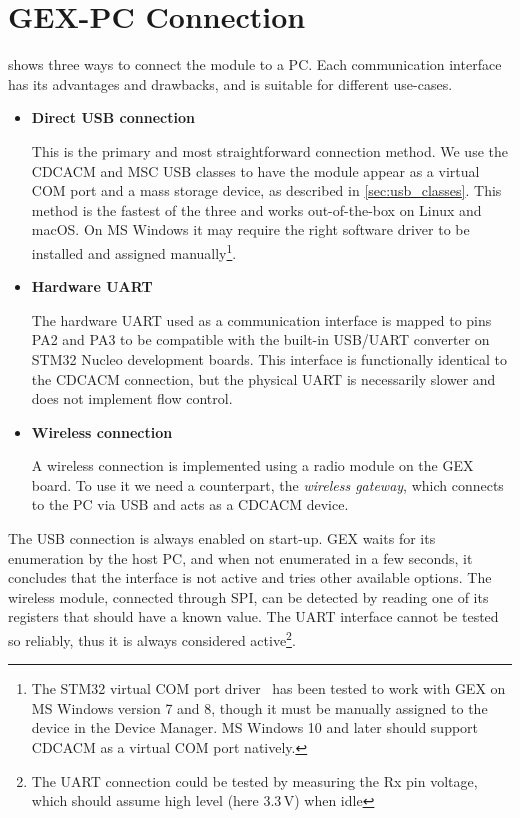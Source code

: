 \section{GEX-PC Connection}

 shows three ways to connect the module to a \gls{PC}. Each communication interface has its advantages and drawbacks, and is suitable for different use-cases.

\begin{itemize}
	\item \textbf{Direct \gls{USB} connection}
		
		This is the primary and most straightforward connection method. We use the \gls{CDCACM} and \gls{MSC} \gls{USB} classes to have the module appear as a virtual COM port and a mass storage device, as described in \cref{sec:usb_classes}. This method is the fastest of the three and works out-of-the-box on Linux and macOS. On MS Windows it may require the right software driver to be installed and assigned manually\footnote{The STM32 virtual COM port driver~\cite{stm-vcom} has been tested to work with GEX on MS Windows version 7 and 8, though it must be manually assigned to the device in the Device Manager. MS Windows 10 and later should support \gls{CDCACM} as a virtual COM port natively.}.
	
	\item \textbf{Hardware \gls{UART}}
	
		The hardware UART used as a communication interface is mapped to pins PA2 and PA3 to be compatible with the built-in \gls{USB}/\gls{UART} converter on STM32 Nucleo development boards. This interface is functionally identical to the \gls{CDCACM} connection, but the physical \gls{UART} is necessarily slower and does not implement flow control.
		
	\item \textbf{Wireless connection}
	
		A wireless connection is implemented using a radio module on the GEX board. To use it we need a counterpart, the \textit{wireless gateway}, which connects to the \gls{PC} via \gls{USB} and acts as a \gls{CDCACM} device.
	
\end{itemize}

The \gls{USB} connection is always enabled on start-up. GEX waits for its enumeration by the host \gls{PC}, and when not enumerated in a few seconds, it concludes that the interface is not active and tries other available options. The wireless module, connected through \gls{SPI}, can be detected by reading one of its registers that should have a known value. The \gls{UART} interface cannot be tested so reliably, thus it is always considered active\footnote{The UART connection could be tested by measuring the Rx pin voltage, which should assume high level (here 3.3\,V) when idle}.

